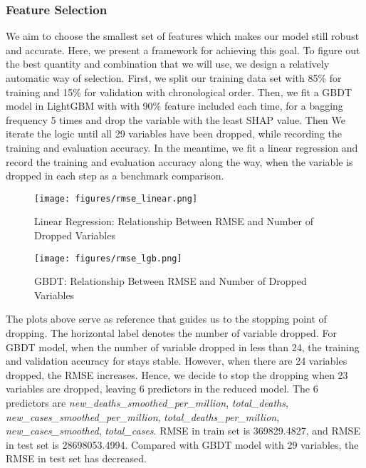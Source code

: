 \documentclass{article}
\begin{document}
\subsubsection{Feature Selection}
We aim to choose the smallest set of features which makes our model still robust and accurate. Here, we present a framework for achieving this goal. To figure out the best quantity and combination that we will use, we design a relatively automatic way of selection. First, we split our training data set with 85\% for training and 15\% for validation with chronological order. Then, we fit a GBDT model in LightGBM with with 90\% feature included each time, for a bagging frequency 5 times and drop the variable with the least SHAP value. Then We iterate the logic until all 29 variables have been dropped, while recording the training and evaluation accuracy. In the meantime, we fit a linear regression and record the training and evaluation accuracy along the way, when the variable is dropped in each step as a benchmark comparison. 

\begin{figure}[H]
    \centering
    \texttt{[image: figures/rmse\_linear.png]}%
    \caption{Linear Regression: Relationship Between RMSE and Number of Dropped Variables}
    \label{fig:heatmap}
\end{figure}

\begin{figure}[H]
    \centering
    \texttt{[image: figures/rmse\_lgb.png]}%
    \caption{GBDT: Relationship Between RMSE and Number of Dropped Variables}
    \label{fig:heatmap}
\end{figure}


\noindent The plots above serve as reference that guides us to the stopping point of dropping. The horizontal label denotes the number of variable dropped. For GBDT model, when the number of variable dropped in less than 24, the training and validation accuracy for stays stable. However, when there are 24 variables dropped, the RMSE increases. Hence, we decide to stop the dropping when 23 variables are dropped, leaving 6 predictors in the reduced model. The 6 predictors are \textit{new\_deaths\_smoothed\_per\_million}, \textit{total\_deaths}, \textit{new\_cases\_smoothed\_per\_million}, \textit{total\_deaths\_per\_million}, \textit{new\_cases\_smoothed}, \textit{total\_cases}. RMSE in train set is 369829.4827, and
RMSE in test set is 28698053.4994. Compared with GBDT model with 29 variables, the RMSE in test set has decreased. \\
\end{document}
